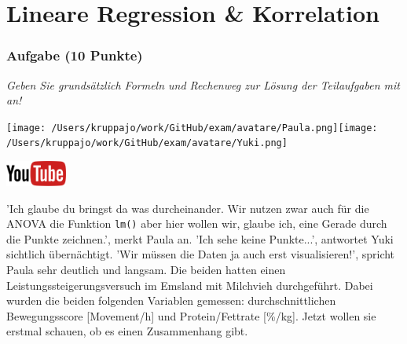 \documentclass[a4paper, 9pt]{scrartcl}\usepackage[]{graphicx}\usepackage[]{xcolor}
\begin{document}
\vspace{1cm}
 




 
\clearpage
\part{Lineare Regression \& Korrelation}

\section{Aufgabe \hfill (10 Punkte)}

\textit{Geben Sie grundsätzlich Formeln und Rechenweg zur Lösung der Teilaufgaben mit an!} \\[1Ex]
 

 
\begin{minipage}[t]{0.5\textwidth}
\texttt{[image: /Users/kruppajo/work/GitHub/exam/avatare/Paula.png]}\hspace{-4mm}\texttt{[image: /Users/kruppajo/work/GitHub/exam/avatare/Yuki.png]}
\end{minipage}
\begin{minipage}[t]{0.5\textwidth}
\hfill
\href{https://youtu.be/kHmfEmU6lrk}{\includegraphics[width = 2cm]{img/youtube}}
\end{minipage}
\vspace{1ex}



'Ich glaube du bringst da was durcheinander. Wir nutzen zwar auch für die ANOVA die Funktion \texttt{lm()} aber hier wollen wir, glaube ich, eine Gerade durch die Punkte zeichnen.', merkt Paula an. 'Ich sehe keine Punkte...', antwortet Yuki sichtlich übernächtigt. 'Wir müssen die Daten ja auch erst visualisieren!', spricht Paula sehr deutlich und langsam. Die beiden hatten einen Leistungssteigerungsversuch im Emsland mit Milchvieh durchgeführt. Dabei wurden die beiden folgenden Variablen gemessen: durchschnittlichen Bewegungsscore [Movement/h] und Protein/Fettrate [\%/kg]. Jetzt wollen sie erstmal schauen, ob es einen Zusammenhang gibt.
\end{document}
